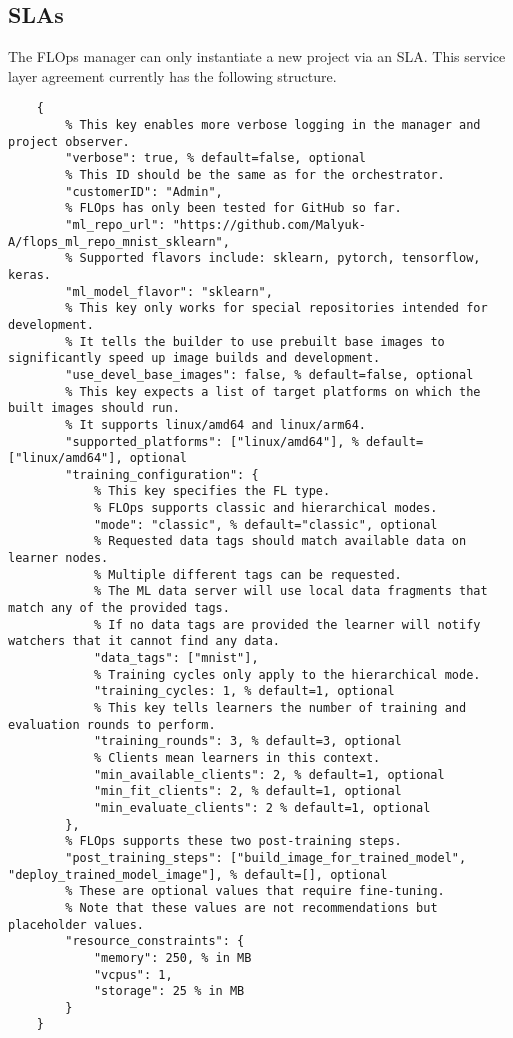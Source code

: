 \pagebreak
\subsection{SLAs}
The FLOps manager can only instantiate a new project via an SLA.
This service layer agreement currently has the following structure.

\begin{lstlisting}
    {
        % This key enables more verbose logging in the manager and project observer.
        "verbose": true, % default=false, optional
        % This ID should be the same as for the orchestrator.
        "customerID": "Admin", 
        % FLOps has only been tested for GitHub so far.
        "ml_repo_url": "https://github.com/Malyuk-A/flops_ml_repo_mnist_sklearn",
        % Supported flavors include: sklearn, pytorch, tensorflow, keras.
        "ml_model_flavor": "sklearn",
        % This key only works for special repositories intended for development.
        % It tells the builder to use prebuilt base images to significantly speed up image builds and development.
        "use_devel_base_images": false, % default=false, optional
        % This key expects a list of target platforms on which the built images should run.
        % It supports linux/amd64 and linux/arm64.
        "supported_platforms": ["linux/amd64"], % default=["linux/amd64"], optional
        "training_configuration": {
            % This key specifies the FL type.
            % FLOps supports classic and hierarchical modes.
            "mode": "classic", % default="classic", optional
            % Requested data tags should match available data on learner nodes.
            % Multiple different tags can be requested.
            % The ML data server will use local data fragments that match any of the provided tags.
            % If no data tags are provided the learner will notify watchers that it cannot find any data.
            "data_tags": ["mnist"],
            % Training cycles only apply to the hierarchical mode.
            "training_cycles: 1, % default=1, optional
            % This key tells learners the number of training and evaluation rounds to perform.
            "training_rounds": 3, % default=3, optional
            % Clients mean learners in this context.
            "min_available_clients": 2, % default=1, optional
            "min_fit_clients": 2, % default=1, optional
            "min_evaluate_clients": 2 % default=1, optional
        },
        % FLOps supports these two post-training steps.
        "post_training_steps": ["build_image_for_trained_model", "deploy_trained_model_image"], % default=[], optional
        % These are optional values that require fine-tuning.
        % Note that these values are not recommendations but placeholder values.
        "resource_constraints": {
            "memory": 250, % in MB
            "vcpus": 1,
            "storage": 25 % in MB
        }
    }
\end{lstlisting}

